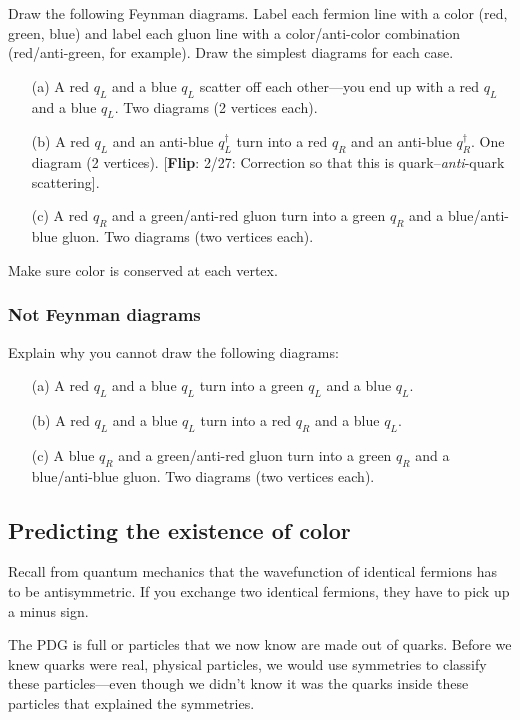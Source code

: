 \documentclass[12pt]{article}
\newcommand{\flip}[1]{{\color{red} [\textbf{Flip}: {#1}]}}
\begin{document}
Draw the following Feynman diagrams. Label each fermion line with a color (red, green, blue) and label each gluon line with a color/anti-color combination (red/anti-green, for example).  Draw the simplest diagrams for each case.
\begin{enumerate}
	\item[(a)] A red $q_L$ and a blue $q_L$ scatter off each other---you end up with a red $q_L$ and a blue $q_L$. Two diagrams (2 vertices each). 
	\item[(b)] A red $q_L$ and an anti-blue $q_L^\dag$ turn into a red $q_R$ and an anti-blue $q_R^\dag$. One diagram (2 vertices).  \flip{2/27: Correction so that this is quark--\emph{anti}-quark scattering}.
	\item[(c)] A red $q_R$ and a green/anti-red gluon turn into a green $q_R$ and  a blue/anti-blue gluon. Two diagrams (two vertices each). 
\end{enumerate}
Make sure color is conserved at each vertex.


\subsubsection{Not Feynman diagrams}

Explain why you cannot draw the following diagrams:
\begin{enumerate}
	\item[(a)] A red $q_L$ and a blue $q_L$ turn into a green $q_L$ and a blue $q_L$. 
	\item[(b)] A red $q_L$ and a blue $q_L$ turn into a red $q_R$ and a blue $q_L$. 
	\item[(c)] A blue $q_R$ and a green/anti-red gluon turn into a green $q_R$ and a blue/anti-blue gluon. Two diagrams (two vertices each). 
\end{enumerate}


\subsection{Predicting the existence of color}

Recall from quantum mechanics that the wavefunction of identical fermions has to be antisymmetric. If you exchange two identical fermions, they have to pick up a minus sign. 

The PDG is full or particles that we now know are made out of quarks. Before we knew quarks were real, physical particles, we would use symmetries to classify these particles---even though we didn't know it was the quarks inside these particles that explained the symmetries. 
\end{document}
